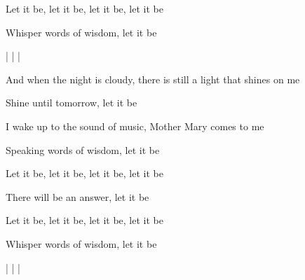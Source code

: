 \begin{song}
\bigskip

Let it be, let it be, let it be, let it be \par
{}Whisper words of wisdom, let it be    \par

\bigskip

   |    |   | 

\bigskip

And when the night is cloudy, there is still a light that shines on me \par
{}Shine until tomorrow, let it be    \par
I wake up to the sound of music, Mother Mary comes to me \par
{}Speaking words of wisdom, let it be    \par

\bigskip

Let it be, let it be, let it be, let it be \par
{}There will be an answer, let it be    \par

\bigskip

Let it be, let it be, let it be, let it be \par
{}Whisper words of wisdom, let it be    \par

\bigskip

   |    |   | 

\end{song}
